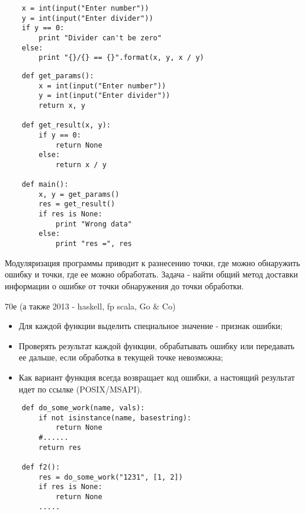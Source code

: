 \documentclass{article}
\begin{document}
\LARGE

\begin{lstlisting}
    x = int(input("Enter number"))
    y = int(input("Enter divider"))
    if y == 0:
        print "Divider can't be zero"
    else:
        print "{}/{} == {}".format(x, y, x / y)
\end{lstlisting}
\newpage

\begin{lstlisting}
	def get_params():
	    x = int(input("Enter number"))
	    y = int(input("Enter divider"))
	    return x, y
	    
	def get_result(x, y):
	    if y == 0:
	        return None
	    else:
	        return x / y
	
	def main():
	    x, y = get_params()
	    res = get_result()
	    if res is None:
	        print "Wrong data"
	    else:
	        print "res =", res
\end{lstlisting}
\newpage

Модуляризация программы приводит к разнесению точки, где можно обнаружить ошибку
и точки, где ее можно обработать. Задача - найти общий метод доставки информации 
о ошибке от точки обнаружения до точки обработки.
\newpage

\begin{center} 70е (а также 2013 - haskell, fp scala, Go \& Co) \end{center}
\begin{itemize}
	\item Для каждой функции выделить специальное значение - признак ошибки;
	\item Проверять результат каждой функции, обрабатывать ошибку
	        или передавать ее дальше, если обработка в текущей точке невозможна;
	\item Как вариант функция всегда возвращает код ошибки, а настоящий 
	        результат идет по ссылке (POSIX/MSAPI).
\end{itemize}
\begin{lstlisting}
	def do_some_work(name, vals):
		if not isinstance(name, basestring):
			return None
		#......
		return res

	def f2():
		res = do_some_work("1231", [1, 2])
		if res is None:
			return None
		.....
\end{lstlisting}
\newpage
\end{document}
